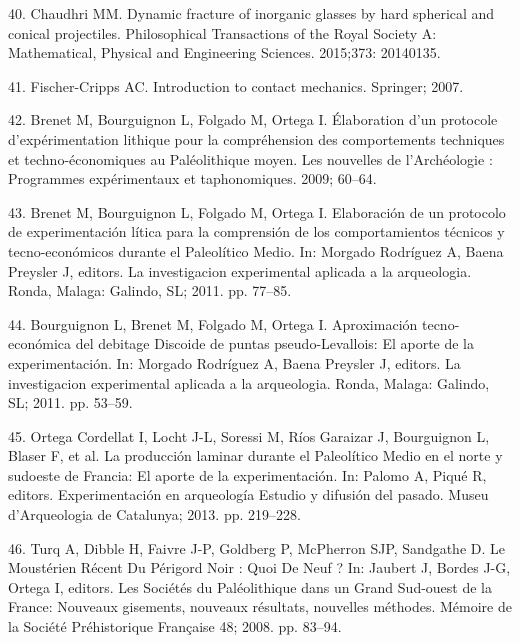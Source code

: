 \documentclass[10pt,letterpaper]{article}
\newenvironment{cslreferences}%
  {}%
  {\par}
\begin{document}
\begin{cslreferences}
\leavevmode\hypertarget{ref-chaudhri_dynamic_2015}{}%
40. Chaudhri MM. Dynamic fracture of inorganic glasses by hard spherical
and conical projectiles. Philosophical Transactions of the Royal Society
A: Mathematical, Physical and Engineering Sciences. 2015;373: 20140135.

\leavevmode\hypertarget{ref-fischer-cripps_introduction_2007}{}%
41. Fischer-Cripps AC. Introduction to contact mechanics. Springer;
2007.

\leavevmode\hypertarget{ref-brenet_elaboration_2009}{}%
42. Brenet M, Bourguignon L, Folgado M, Ortega I. Élaboration d'un
protocole d'expérimentation lithique pour la compréhension des
comportements techniques et techno-économiques au Paléolithique moyen.
Les nouvelles de l'Archéologie : Programmes expérimentaux et
taphonomiques. 2009; 60--64.

\leavevmode\hypertarget{ref-brenet_elaboracion_2011}{}%
43. Brenet M, Bourguignon L, Folgado M, Ortega I. Elaboración de un
protocolo de experimentación lítica para la comprensión de los
comportamientos técnicos y tecno-económicos durante el Paleolítico
Medio. In: Morgado Rodríguez A, Baena Preysler J, editors. La
investigacion experimental aplicada a la arqueologia. Ronda, Malaga:
Galindo, SL; 2011. pp. 77--85.

\leavevmode\hypertarget{ref-bourguignon_aproximacion_2011}{}%
44. Bourguignon L, Brenet M, Folgado M, Ortega I. Aproximación
tecno-económica del debitage Discoide de puntas pseudo-Levallois: El
aporte de la experimentación. In: Morgado Rodríguez A, Baena Preysler J,
editors. La investigacion experimental aplicada a la arqueologia. Ronda,
Malaga: Galindo, SL; 2011. pp. 53--59.

\leavevmode\hypertarget{ref-ortega_cordellat_produccion_2013}{}%
45. Ortega Cordellat I, Locht J-L, Soressi M, Ríos Garaizar J,
Bourguignon L, Blaser F, et al. La producción laminar durante el
Paleolítico Medio en el norte y sudoeste de Francia: El aporte de la
experimentación. In: Palomo A, Piqué R, editors. Experimentación en
arqueología Estudio y difusión del pasado. Museu d'Arqueologia de
Catalunya; 2013. pp. 219--228.

\leavevmode\hypertarget{ref-jaubert_mousterien_2008}{}%
46. Turq A, Dibble H, Faivre J-P, Goldberg P, McPherron SJP, Sandgathe
D. Le Moustérien Récent Du Périgord Noir : Quoi De Neuf ? In: Jaubert J,
Bordes J-G, Ortega I, editors. Les Sociétés du Paléolithique dans un
Grand Sud-ouest de la France: Nouveaux gisements, nouveaux résultats,
nouvelles méthodes. Mémoire de la Société Préhistorique Française 48;
2008. pp. 83--94.


\end{cslreferences}
\end{document}
